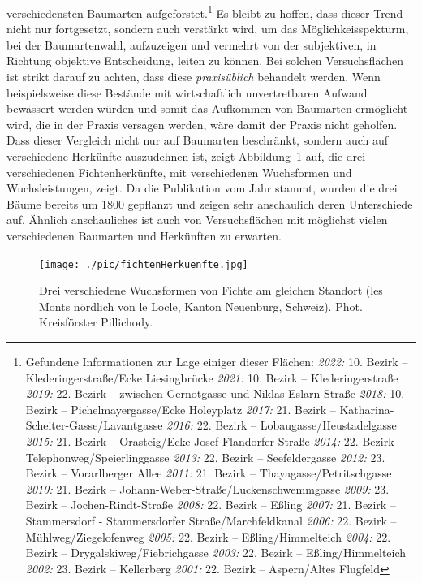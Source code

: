 \documentclass[twocolumn]{scrartcl}
\begin{document}
verschiedensten Baumarten aufgeforstet.\footnote{Gefundene Informationen zur
Lage einiger dieser Flächen:
\emph{2022:} 10. Bezirk -- Klederingerstraße/Ecke Liesingbrücke
\emph{2021:} 10. Bezirk -- Klederingerstraße
\emph{2019:} 22. Bezirk -- zwischen Gernotgasse und Niklas-Eslarn-Straße
\emph{2018:} 10. Bezirk -- Pichelmayergasse/Ecke Holeyplatz
\emph{2017:} 21. Bezirk -- Katharina-Scheiter-Gasse/Lavantgasse
\emph{2016:} 22. Bezirk -- Lobaugasse/Heustadelgasse
\emph{2015:} 21. Bezirk -- Orasteig/Ecke Josef-Flandorfer-Straße
\emph{2014:} 22. Bezirk -- Telephonweg/Speierlinggasse
\emph{2013:} 22. Bezirk -- Seefeldergasse
\emph{2012:} 23. Bezirk -- Vorarlberger Allee
\emph{2011:} 21. Bezirk -- Thayagasse/Petritschgasse
\emph{2010:} 21. Bezirk -- Johann-Weber-Straße/Luckenschwemmgasse
\emph{2009:} 23. Bezirk -- Jochen-Rindt-Straße
\emph{2008:} 22. Bezirk -- Eßling
\emph{2007:} 21. Bezirk -- Stammersdorf - Stammersdorfer Straße/Marchfeldkanal
\emph{2006:} 22. Bezirk -- Mühlweg/Ziegelofenweg
\emph{2005:} 22. Bezirk -- Eßling/Himmelteich
\emph{2004:} 22. Bezirk -- Drygalskiweg/Fiebrichgasse
\emph{2003:} 22. Bezirk -- Eßling/Himmelteich
\emph{2002:} 23. Bezirk -- Kellerberg
\emph{2001:} 22. Bezirk -- Aspern/Altes Flugfeld}
Es bleibt zu hoffen, dass dieser Trend nicht nur
fortgesetzt, sondern auch verstärkt wird, um das Möglichkeisspekturm, bei der
Baumartenwahl, aufzuzeigen und vermehrt von der subjektiven, in Richtung
objektive Entscheidung, leiten zu können. Bei solchen Versuchsflächen ist strikt
darauf zu achten, dass diese \emph{praxisüblich} behandelt werden. Wenn
beispielsweise diese Bestände mit wirtschaftlich unvertretbaren Aufwand
bewässert werden würden und somit das Aufkommen von Baumarten ermöglicht wird,
die in der Praxis versagen werden, wäre damit der Praxis nicht geholfen. Dass
dieser Vergleich nicht nur auf Baumarten beschränkt, sondern auch auf
verschiedene Herkünfte auszudehnen ist, zeigt
Abbildung~\ref{fig:fichtenHerkuenfte}
\citep[S.~86]{hegi1906IllustrierteFloraBd1} auf, die drei verschiedenen
Fichtenherkünfte, mit verschiedenen Wuchsformen und Wuchsleistungen, zeigt. Da
die Publikation vom Jahr \citeyear{hegi1906IllustrierteFloraBd1} stammt, wurden
die drei Bäume bereits um 1800 gepflanzt und zeigen sehr anschaulich deren
Unterschiede auf. Ähnlich anschauliches ist auch von Versuchsflächen mit
möglichst vielen verschiedenen Baumarten und Herkünften zu erwarten.

\begin{figure}[htbp]
  \centering
  \texttt{[image: ./pic/fichtenHerkuenfte.jpg]}
  \caption{Drei verschiedene Wuchsformen von Fichte am gleichen
    Standort (les Monts nördlich von le Locle, Kanton Neuenburg,
    Schweiz). Phot. Kreisförster
    Pillichody. \citep[S.~86]{hegi1906IllustrierteFloraBd1}}
  \label{fig:fichtenHerkuenfte}
\end{figure}
\end{document}
